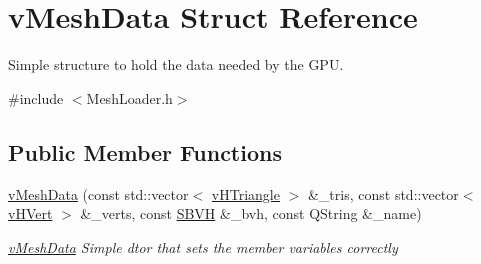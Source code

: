 \hypertarget{structvMeshData}{\section{v\-Mesh\-Data Struct Reference}
\label{structvMeshData}
}


Simple structure to hold the data needed by the G\-P\-U.  




{\ttfamily \#include $<$Mesh\-Loader.\-h$>$}

\subsection*{Public Member Functions}
\begin{DoxyCompactItemize}
\item 
\hyperlink{structvMeshData_a1e9694b28cbc64feac060f1786bd9ec5}{v\-Mesh\-Data} (const std\-::vector$<$ \hyperlink{structvHTriangle}{v\-H\-Triangle} $>$ \&\-\_\-tris, const std\-::vector$<$ \hyperlink{structvHVert}{v\-H\-Vert} $>$ \&\-\_\-verts, const \hyperlink{classSBVH}{S\-B\-V\-H} \&\-\_\-bvh, const Q\-String \&\-\_\-name)
\begin{DoxyCompactList}\small\item\em \hyperlink{structvMeshData}{v\-Mesh\-Data} Simple dtor that sets the member variables correctly \end{DoxyCompactList}\end{DoxyCompactItemize}
